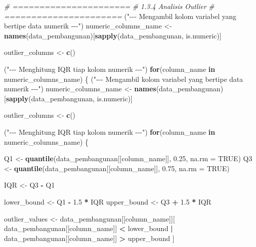 \documentclass[
  12pt,
]{article}
\newenvironment{Shaded}{\begin{snugshade}}{\end{snugshade}}
\newcommand{\AttributeTok}[1]{\textcolor[rgb]{0.13,0.29,0.53}{#1}}
\newcommand{\CommentTok}[1]{\textcolor[rgb]{0.56,0.35,0.01}{\textit{#1}}}
\newcommand{\ConstantTok}[1]{\textcolor[rgb]{0.56,0.35,0.01}{#1}}
\newcommand{\ControlFlowTok}[1]{\textcolor[rgb]{0.13,0.29,0.53}{\textbf{#1}}}
\newcommand{\FloatTok}[1]{\textcolor[rgb]{0.00,0.00,0.81}{#1}}
\newcommand{\FunctionTok}[1]{\textcolor[rgb]{0.13,0.29,0.53}{\textbf{#1}}}
\newcommand{\NormalTok}[1]{#1}
\newcommand{\OtherTok}[1]{\textcolor[rgb]{0.56,0.35,0.01}{#1}}
\newcommand{\SpecialCharTok}[1]{\textcolor[rgb]{0.81,0.36,0.00}{\textbf{#1}}}
\newcommand{\StringTok}[1]{\textcolor[rgb]{0.31,0.60,0.02}{#1}}
\begin{document}
\begin{Shaded}
\begin{Highlighting}[]
\CommentTok{\# ======================}
\CommentTok{\# 1.3.4 Analisis Outlier}
\CommentTok{\# ======================}
\NormalTok{(}\StringTok{"{-}{-}{-} Mengambil kolom variabel yang bertipe data numerik {-}{-}{-}"}\NormalTok{)}
\NormalTok{numeric\_columns\_name }\OtherTok{\textless{}{-}} \FunctionTok{names}\NormalTok{(data\_pembangunan)[}\FunctionTok{sapply}\NormalTok{(data\_pembangunan, is.numeric)]}

\NormalTok{outlier\_columns }\OtherTok{\textless{}{-}} \FunctionTok{c}\NormalTok{()}

\NormalTok{(}\StringTok{"{-}{-}{-} Menghitung IQR tiap kolom numerik {-}{-}{-}"}\NormalTok{)}
\ControlFlowTok{for}\NormalTok{(column\_name }\ControlFlowTok{in}\NormalTok{ numeric\_columns\_name) \{}
\NormalTok{  (}\StringTok{"{-}{-}{-} Mengambil kolom variabel yang bertipe data numerik {-}{-}{-}"}\NormalTok{)}
\NormalTok{  numeric\_columns\_name }\OtherTok{\textless{}{-}} \FunctionTok{names}\NormalTok{(data\_pembangunan)[}\FunctionTok{sapply}\NormalTok{(data\_pembangunan, is.numeric)]}
  
\NormalTok{  outlier\_columns }\OtherTok{\textless{}{-}} \FunctionTok{c}\NormalTok{()}
  
\NormalTok{  (}\StringTok{"{-}{-}{-} Menghitung IQR tiap kolom numerik {-}{-}{-}"}\NormalTok{)}
  \ControlFlowTok{for}\NormalTok{(column\_name }\ControlFlowTok{in}\NormalTok{ numeric\_columns\_name) \{}
  
\NormalTok{    Q1 }\OtherTok{\textless{}{-}} \FunctionTok{quantile}\NormalTok{(data\_pembangunan[[column\_name]], }\FloatTok{0.25}\NormalTok{, }\AttributeTok{na.rm =} \ConstantTok{TRUE}\NormalTok{)}
\NormalTok{    Q3 }\OtherTok{\textless{}{-}} \FunctionTok{quantile}\NormalTok{(data\_pembangunan[[column\_name]], }\FloatTok{0.75}\NormalTok{, }\AttributeTok{na.rm =} \ConstantTok{TRUE}\NormalTok{)}
  
\NormalTok{    IQR }\OtherTok{\textless{}{-}}\NormalTok{ Q3 }\SpecialCharTok{{-}}\NormalTok{ Q1}
  
\NormalTok{    lower\_bound }\OtherTok{\textless{}{-}}\NormalTok{ Q1 }\SpecialCharTok{{-}} \FloatTok{1.5} \SpecialCharTok{*}\NormalTok{ IQR}
\NormalTok{    upper\_bound }\OtherTok{\textless{}{-}}\NormalTok{ Q3 }\SpecialCharTok{+} \FloatTok{1.5} \SpecialCharTok{*}\NormalTok{ IQR}
  
\NormalTok{    outlier\_values }\OtherTok{\textless{}{-}}\NormalTok{ data\_pembangunan[[column\_name]][}
\NormalTok{      data\_pembangunan[[column\_name]] }\SpecialCharTok{\textless{}}\NormalTok{ lower\_bound }\SpecialCharTok{|}
\NormalTok{      data\_pembangunan[[column\_name]] }\SpecialCharTok{\textgreater{}}\NormalTok{ upper\_bound}
\NormalTok{    ]}
  

\end{Highlighting}
\end{Shaded}
\end{document}
